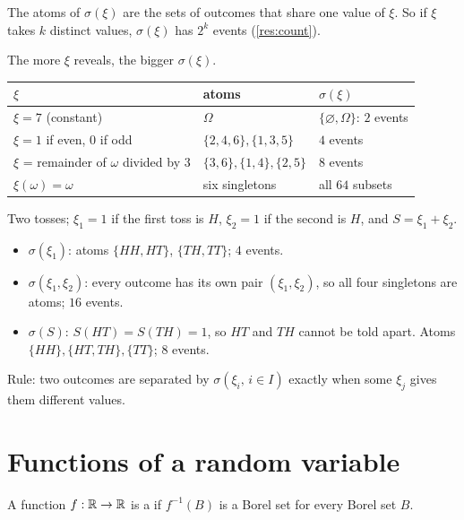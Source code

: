 The atoms of $\sigma(\xi)$ are the sets of outcomes that share one value of $\xi$. So if $\xi$ takes $k$ distinct values, $\sigma(\xi)$ has $2^k$ events (\cref{res:count}).

\begin{example}
\label{ex:sigma-die}
The more $\xi$ reveals, the bigger $\sigma(\xi)$.
\begin{center}
\renewcommand{\arraystretch}{1.25}
\begin{tabular}{@{}lll@{}}
\toprule
$\xi$ & atoms & $\sigma(\xi)$ \\
\midrule
$\xi=7$ (constant) & $\Omega$ & $\{\varnothing,\Omega\}$: $2$ events \\
$\xi=1$ if even, $0$ if odd & $\{2,4,6\},\{1,3,5\}$ & $4$ events \\
$\xi$ = remainder of $\omega$ divided by $3$ & $\{3,6\},\{1,4\},\{2,5\}$ & $8$ events \\
$\xi(\omega)=\omega$ & six singletons & all $64$ subsets \\
\bottomrule
\end{tabular}
\end{center}
\end{example}

\begin{example}
\label{ex:family}
Two tosses; $\xi_1=1$ if the first toss is $H$, $\xi_2=1$ if the second is $H$, and $S=\xi_1+\xi_2$.
\begin{itemize}
  \item $\sigma(\xi_1)$: atoms $\{HH,HT\}$, $\{TH,TT\}$; $4$ events.
  \item $\sigma(\xi_1,\xi_2)$: every outcome has its own pair $(\xi_1,\xi_2)$, so all four singletons are atoms; $16$ events.
  \item $\sigma(S)$: $S(HT)=S(TH)=1$, so $HT$ and $TH$ cannot be told apart. Atoms $\{HH\},\{HT,TH\},\{TT\}$; $8$ events.
\end{itemize}
Rule: two outcomes are separated by $\sigma(\xi_i,\,i\in I)$ exactly when some $\xi_j$ gives them different values.
\end{example}

\section{Functions of a random variable}

\begin{definition}
A function $f:\mathbb{R}\to\mathbb{R}$ is a  if $f^{-1}(B)$ is a Borel set for every Borel set $B$.
\end{definition}

